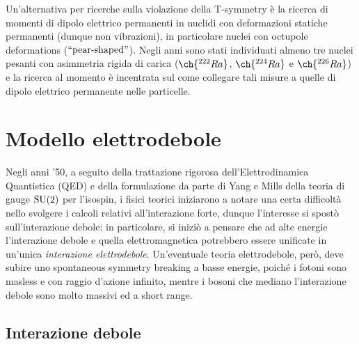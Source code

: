 Un'alternativa per ricerche sulla violazione della T-symmetry è la ricerca di momenti di dipolo elettrico permanenti in nuclidi con deformazioni statiche permanenti (dunque non vibrazioni), in particolare nuclei con octupole deformations ($ ``\text{pear-shaped}" $). Negli anni sono stati individuati almeno tre nuclei pesanti con asimmetria rigida di carica ($ \ch{^{222}Ra} $, $ \ch{^{224}Ra} $ e $ \ch{^{226}Ra} $) e la ricerca al momento è incentrata sul come collegare tali misure a quelle di dipolo elettrico permanente nelle particelle.

\section{Modello elettrodebole}

Negli anni '50, a seguito della trattazione rigorosa dell'Elettrodinamica Quantistica (QED) e della formulazione da parte di Yang e Mills della teoria di gauge $ \mathrm{SU}(2) $ per l'isospin, i fisici teorici iniziarono a notare una certa difficoltà nello svolgere i calcoli relativi all'interazione forte, dunque l'interesse si spostò sull'interazione debole: in particolare, si iniziò a pensare che ad alte energie l'interazione debole e quella elettromagnetica potrebbero essere unificate in un'unica \textit{interazione elettrodebole}.
Un'eventuale teoria elettrodebole, però, deve subire uno spontaneous symmetry breaking a basse energie, poiché i fotoni sono masless e con raggio d'azione infinito, mentre i bosoni che mediano l'interazione debole sono molto massivi ed a short range.

\subsection{Interazione debole}

